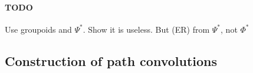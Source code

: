 \todo{}

\paragraph{TODO}
Use groupoids and $\Psi^*$.
Show it is useless.
But (ER) from $\Psi^*$, not $\Phi^*$


\subsection{Construction of path convolutions}









